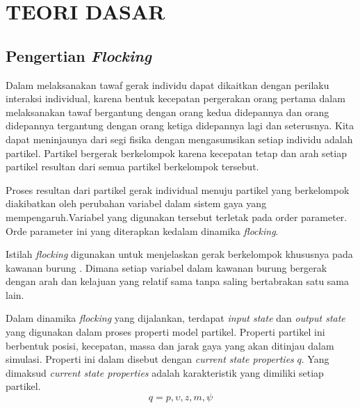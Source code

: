 %
%
%
\chapter{TEORI DASAR}\label{cha:teori}


\section{Pengertian \emph{Flocking}}\label{sec:pengertianflocking}
\hspace {0.5cm}Dalam melaksanakan tawaf gerak individu dapat dikaitkan dengan perilaku interaksi individual, karena bentuk kecepatan pergerakan orang pertama dalam melaksanakan tawaf bergantung dengan orang kedua didepannya dan orang didepannya tergantung dengan orang ketiga didepannya lagi dan seterusnya. Kita dapat meninjaunya dari segi fisika dengan mengasumsikan setiap individu adalah partikel. Partikel bergerak berkelompok karena kecepatan tetap dan arah setiap partikel resultan dari semua partikel berkelompok tersebut.

\hspace {0.5cm}Proses resultan dari partikel gerak individual menuju partikel yang berkelompok diakibatkan oleh perubahan variabel dalam sistem gaya yang mempengaruh.Variabel yang digunakan tersebut terletak pada order parameter. Orde parameter ini yang diterapkan kedalam dinamika \textit{flocking}.

\hspace {0.5cm}Istilah \emph{flocking} digunakan untuk menjelaskan gerak berkelompok khususnya pada kawanan burung \citep{Toner1998}. Dimana setiap variabel dalam kawanan burung bergerak dengan arah dan kelajuan yang relatif sama tanpa saling bertabrakan satu sama lain.



\hspace {0.5cm}Dalam dinamika \emph{flocking} yang dijalankan, terdapat \textit{input state} dan \textit{output state} yang digunakan dalam proses properti model partikel. Properti partikel ini berbentuk posisi, kecepatan, massa dan jarak gaya yang akan ditinjau dalam simulasi. Properti ini dalam \citep{Bajec2007} disebut dengan \textit{current state properties}  $q$. Yang dimaksud \textit{current state properties} adalah karakteristik yang dimiliki setiap partikel.
\begin{equation}
q = {p,\upsilon,z,m,\psi} 
\end{equation}




